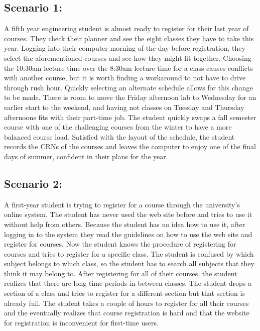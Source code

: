 \documentclass{article}
\begin{document}
\subsection{Scenario 1:}
A fifth year engineering student is almost ready to register for their last year of courses. They check their planner and see the eight classes they have to take this year. Logging into their computer morning of the day before registration, they select the aforementioned courses and see how they might fit together. Choosing the 10:30am lecture time over the 8:30am lecture time for a class causes conflicts with another course, but it is worth finding a workaround to not have to drive through rush hour. Quickly selecting an alternate schedule allows for this change to be made. There is room to move the Friday afternoon lab to Wednesday for an earlier start to the weekend, and having not classes on Tuesday and Thursday afternoons fits with their part-time job. The student quickly swaps a fall semester course with one of the challenging courses from the winter to have a more balanced course load. Satisfied with the layout of the schedule, the student records the CRNs of the courses and leaves the computer to enjoy one of the final days of summer, confident in their plans for the year.


\subsection{Scenario 2:}
 A first-year student is trying to register for a course through the university's online system. The student has never used the web site before and tries to use it without help from others. Because the student has no idea how to use it, after logging in to the system they read the guidelines on how to use the web site and register for courses. Now the student knows the procedure of registering for courses and tries to register for a specific class. The student is confused by which subject belongs to which class, so the student has to search all subjects that they think it may belong to. After registering for all of their courses, the student realizes that there are long time periods in-between classes. The student drops a section of a class and tries to register for a different section but that section is already full. The student takes a couple of hours to register for all their courses and the eventually realizes that course registration is hard and that the website for registration is inconvenient for first-time users.
\end{document}
